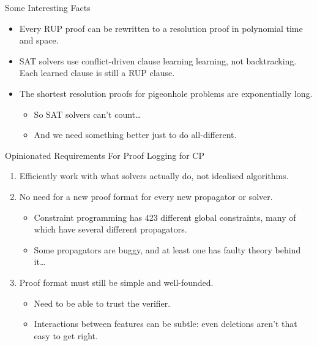\documentclass[aspectratio=169,compress,10pt]{beamer}
\begin{document}
\begin{frame}{Some Interesting Facts}
    \begin{itemize}
        \item Every RUP proof can be rewritten to a resolution proof in polynomial time and space.
        \item SAT solvers use conflict-driven clause learning learning, not backtracking. Each
            learned clause is still a RUP clause.
        \item The shortest resolution proofs for pigeonhole problems are exponentially long.
            \begin{itemize}
                \item <2-> So SAT solvers can't count\ldots
                \item <2-> And we need something better just to do all-different.
            \end{itemize}
    \end{itemize}
\end{frame}

\begin{frame}{Opinionated Requirements For Proof Logging for CP}
    \begin{enumerate}
        \item Efficiently work with what solvers actually do, not idealised algorithms. \pause
        \item No need for a new proof format for every new propagator or solver.
            \begin{itemize}
                \item Constraint programming has 423 different global constraints, many of which
                    have several different propagators.
                \item Some propagators are buggy, and at least one has faulty theory behind it\ldots
            \end{itemize} \pause
        \item Proof format must still be simple and well-founded.
            \begin{itemize}
                \item Need to be able to trust the verifier.
                \item Interactions between features can be subtle: even deletions aren't that easy
                    to get right.
            \end{itemize}
    \end{enumerate}
\end{frame}
\end{document}
